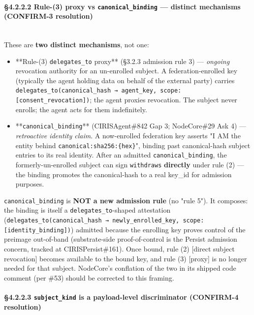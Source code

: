\documentclass[11pt]{article}
\begin{document}
\paragraph{§4.2.2.2 Rule-(3) proxy vs \texttt{canonical\_binding} — distinct mechanisms (CONFIRM-3 resolution)}\mbox{}\\


These are \textbf{two distinct mechanisms}, not one:


\begin{itemize}\setlength\itemsep{0pt}
\item **Rule-(3) \texttt{delegates\_to} proxy** (§3.2.3 admission rule 3) — \textit{ongoing} revocation authority for an un-enrolled subject. A federation-enrolled key (typically the agent holding data on behalf of the external party) carries \texttt{delegates\_to(canonical\_hash → agent\_key, scope: [consent\_revocation])}; the agent proxies revocation. The subject never enrolls; the agent acts for them indefinitely.
\item **\texttt{canonical\_binding}** (CIRISAgent\#842 Gap 3; NodeCore\#29 Ask 4) — \textit{retroactive identity claim}. A now-enrolled federation key asserts "I AM the entity behind \texttt{canonical:sha256:\{hex\}}", binding past canonical-hash subject entries to its real identity. After an admitted \texttt{canonical\_binding}, the formerly-un-enrolled subject can sign \texttt{withdraws} \textbf{directly} under rule (2) — the binding promotes the canonical-hash to a real key\_id for admission purposes.
\end{itemize}


\texttt{canonical\_binding} is \textbf{NOT a new admission rule} (no "rule 5"). It composes: the binding is itself a \texttt{delegates\_to}-shaped attestation (\texttt{delegates\_to(canonical\_hash → newly\_enrolled\_key, scope: [identity\_binding])}) admitted because the enrolling key proves control of the preimage out-of-band (substrate-side proof-of-control is the Persist admission concern, tracked at CIRISPersist\#161). Once bound, rule (2) [direct subject revocation] becomes available to the bound key, and rule (3) [proxy] is no longer needed for that subject. NodeCore's conflation of the two in its shipped code comment (per \#53) should be corrected to this framing.


\paragraph{§4.2.2.3 \texttt{subject\_kind} is a payload-level discriminator (CONFIRM-4 resolution)}\mbox{}\\
\end{document}
